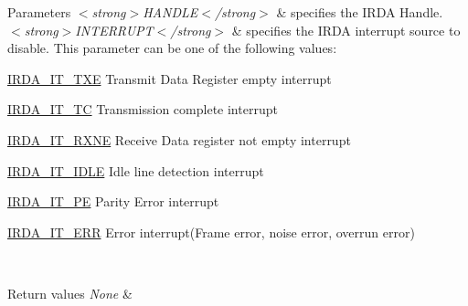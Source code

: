 \begin{DoxyParams}{Parameters}
{\em $<$strong$>$\+H\+A\+N\+D\+L\+E$<$/strong$>$} & specifies the I\+R\+DA Handle. \\
\hline
{\em $<$strong$>$\+I\+N\+T\+E\+R\+R\+U\+P\+T$<$/strong$>$} & specifies the I\+R\+DA interrupt source to disable. This parameter can be one of the following values\+: \begin{DoxyItemize}
\item \hyperlink{group___i_r_d_a___interrupt__definition_ga5e81e9fd3d52bafcf21281c10d2ca257}{I\+R\+D\+A\+\_\+\+I\+T\+\_\+\+T\+XE} Transmit Data Register empty interrupt \item \hyperlink{group___i_r_d_a___interrupt__definition_gadd3e4b796b67db171ca04c5297d4e667}{I\+R\+D\+A\+\_\+\+I\+T\+\_\+\+TC} Transmission complete interrupt \item \hyperlink{group___i_r_d_a___interrupt__definition_ga8f2de9c6c3cccfb2de0277ce10f23b13}{I\+R\+D\+A\+\_\+\+I\+T\+\_\+\+R\+X\+NE} Receive Data register not empty interrupt \item \hyperlink{group___i_r_d_a___interrupt__definition_ga32dfb69029c5576d82feb59129d11000}{I\+R\+D\+A\+\_\+\+I\+T\+\_\+\+I\+D\+LE} Idle line detection interrupt \item \hyperlink{group___i_r_d_a___interrupt__definition_ga1d2b4b601ece8f1ab0b2542412bb2533}{I\+R\+D\+A\+\_\+\+I\+T\+\_\+\+PE} Parity Error interrupt \item \hyperlink{group___i_r_d_a___interrupt__definition_ga5649210cc5343a80483178849a11ac66}{I\+R\+D\+A\+\_\+\+I\+T\+\_\+\+E\+RR} Error interrupt(\+Frame error, noise error, overrun error) \end{DoxyItemize}
\\
\hline
\end{DoxyParams}

\begin{DoxyRetVals}{Return values}
{\em None} & \\
\hline
\end{DoxyRetVals}
\mbox{\label{group___i_r_d_a___exported___macros_ga94d14e3105494108f4ba6f69aa1728a7}} 
